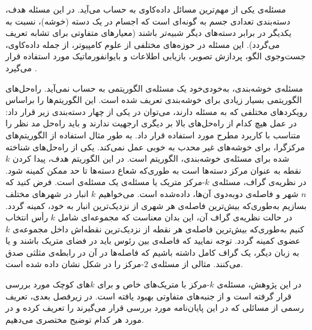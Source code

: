 


مسئله‌ی  یکی از مهم‌ترین مسائل داده‌کاوی به حساب می‌آید. در این مسئله هدف، دسته‌بندی تعدادی جسم به گونه‌ای است که اجسام در یک دسته (خوشه)، نسبت به یکدیگر در برابر  دسته‌های دیگر شبیه‌تر باشند (معیار‌های متفاوتی برای تشابه تعریف می‌گردد). این مسئله در حوزه‌های مختلفی از علوم کامپیوتر، از جمله داده‌کاوی، جست‌وجوی الگو، پردازش تصویر، بازیابی اطلاعات و بایوانفورماتیک مورد استفاده قرار می‌گیرد .

مسئله‌ی خوشه‌بندی، به‌خودی‌خود یک مسئله‌ی الگوریتمی به حساب نمی‌آید. راه‌حل‌های الگوریتمی بسیار زیادی برای خوشه‌بندی تعریف شده است. این الگوریتم‌ها را براساس رویکرد‌های مختلفی که به مسئله دارند، می‌توان در یکی از چهار دسته‌بندی زیر قرار داد:
در عمل هیچ کدام از راه‌حل‌های بالا بر دیگری ارجهیت ندارند و باید راه‌حل مد نظر را متناسب با کاربرد مطرح مورد استفاده قرار داد. به طور مثال استفاده از الگوریتم‌های مرکزگرا، برای خوشه‌های غیر محدب به خوبی عمل نمی‌کند.
یکی از راه‌حل‌های شناخته شده برای مسئله‌ی خوشه‌بندی، الگوریتم  است. در این الگوریتم هدف، پیدا کردن $k$ نقطه به عنوان مرکز دسته‌ها است به طوری‌که شعاع دسته‌ها تا حد ممکن کمینه شود. در نظریه‌ی گراف، مسئله‌ی $k$-مرکز متریک یا مسئله‌ی  یک مسئله‌ی  است. فرض کنید که $n$ شهر و فاصله‌ی دوبه‌دوی آن‌ها، داده‌شده است. می‌خواهیم $k$ انبار در شهرهای مختلف بسازیم به‌طوری‌که بیش‌ترین فاصله‌ی هر شهری از نزدیک‌ترین انبار به خود، کمینه گردد. در حالت نظریه‌ی گراف آن، این بدان معناست که مجموعه‌ای شامل $k$ رأس انتخاب کنیم به‌طوری‌که بیش‌ترین فاصله‌ی هر نقطه از نزدیک‌ترین نقطه‌اش داخل مجموعه‌ی $k$ عضوی کمینه گردد.  توجه نمایید که فاصله‌ی بین رئوس باید در فضای متریک باشند و یا به زبان دیگر، یک گراف کامل داشته باشیم که فاصله‌ها در آن در رابطه‌ی مثلثی صدق می‌کنند. مثالی از مسئله‌ی $2$-مرکز را در شکل  نشان داده شده است.

در این پژوهش، مسئله‌ی $k$-مرکز با متریک‌های خاص و برای $k$های کوچک مورد بررسی قرار گرفته است و از‌ جنبه‌های متفاوتی بهبود یافته است. در زیر‌فصل بعدی، تعریف رسمی از مسائلی که در این پایان‌نامه مورد بررسی قرار می‌گیرند را تعریف کرده و در مورد هر کدام توضیح مختصری می‌دهیم.

